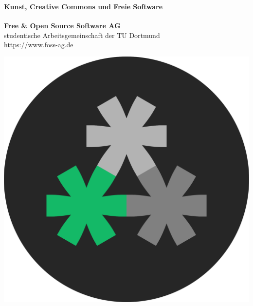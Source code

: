 \documentclass[a0,portrait]{a0poster}
\begin{document}
\begin{minipage}[b]{0.75\linewidth}
\veryHuge \color{fossgreen} \textbf{Kunst, Creative Commons und Freie Software} \color{Black}\\\\
\huge \textbf{Free \& Open Source Software AG}\\[0.5cm]
\huge studentische Arbeitsgemeinschaft der TU Dortmund\\[0.4cm]
\Large \url{https://www.foss-ag.de}\\
\end{minipage}
\begin{minipage}[b]{0.25\linewidth}
\includegraphics[width=16cm]{figures/2000px.png}\\
\end{minipage}
\end{document}
